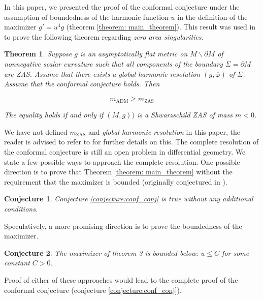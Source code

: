 \documentclass{amsart}
\newcommand{\s}{\Sigma}
\newtheorem{theorem}{Theorem}
\newtheorem{conjecture}{Conjecture}
\theoremstyle{named}
\begin{document}
In this paper, we presented the proof of the conformal conjecture under the assumption of boundedness of the harmonic function $u$ in the definition of the maximizer $g' = u^4g$ (theorem \ref{theorem: main_theorem}). This result was used in \cite{Bray:2009voj} to prove the following theorem regarding \textit{zero area singularities}.

\begin{theorem}

    Suppose $g$ is an asymptotically flat metric on $M \backslash \partial M$ of nonnegative scalar curvature such that all components of the boundary $\s = \partial M$ are ZAS. Assume that there exists a global harmonic resolution $(\overline{g}, \overline{\varphi})$ of $\s$. Assume that the conformal conjecture holds. Then

    \begin{equation*}
        m_{\text{ADM}} \geq m_{\text{ZAS}}
    \end{equation*}

    The equality holds if and only if $(M,g))$ is a Shwarzschild ZAS of mass $m < 0$.
    
\end{theorem}

We have not defined $m_{\text{ZAS}}$ and \textit{global harmonic resolution} in this paper, the reader is advised to refer to \cite{Bray:2009voj} for further details on this. The complete resolution of the conformal conjecture is still an open problem in differential geometry. We state a few possible ways to approach the complete resolution. One possible direction is to prove that Theorem \ref{theorem: main_theorem} without the requirement that the maximizer is bounded (originally conjectured in \cite{Bray:2009voj}).

\begin{conjecture} 
    Conjecture \ref{conjecture:conf_conj} is true without any additional conditions.
\end{conjecture}

Speculatively, a more promising direction is to prove the boundedness of the maximizer.

\begin{conjecture}
    The maximizer of theorem 3 is bounded below: $u \leq C$ for some constant $C > 0$.
\end{conjecture}

Proof of either of these approaches would lead to the complete proof of the conformal conjecture (conjecture \ref{conjecture:conf_conj}).
\end{document}

